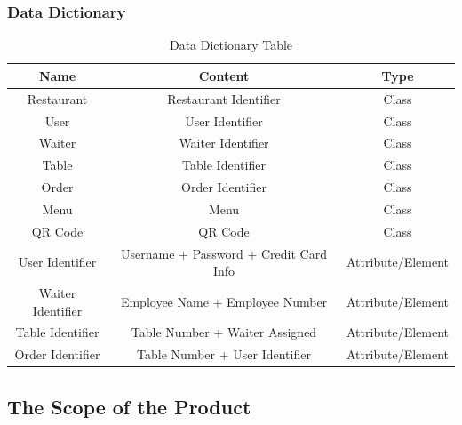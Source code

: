 \documentclass[12pt, titlepage]{article}
\begin{document}
\subsubsection{Data Dictionary}
\begin{center}

\begin{table}[H]
  \centering
\begin{tabular}{ |c|c|c| }

\hline
Name & Content & Type \\
\hline
Restaurant & Restaurant Identifier & Class \\
User & User Identifier & Class \\
Waiter & Waiter Identifier & Class \\
Table & Table Identifier & Class \\
Order & Order Identifier & Class \\
Menu & Menu & Class \\
QR Code & QR Code & Class \\
User Identifier & Username + Password + Credit Card Info & Attribute/Element \\
Waiter Identifier & Employee Name + Employee Number & Attribute/Element \\
Table Identifier & Table Number + Waiter Assigned & Attribute/Element \\
Order Identifier & Table Number + User Identifier & Attribute/Element \\


\hline
\end{tabular}
\caption{Data Dictionary Table}
\end{table}
\end{center}
\subsection{The Scope of the Product}
\end{document}
